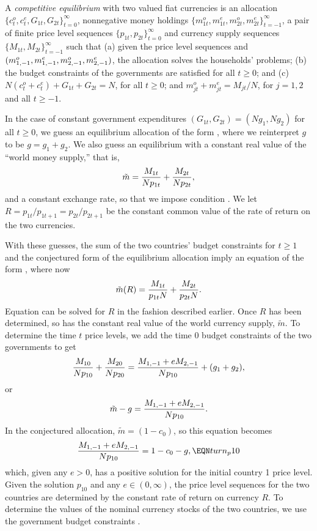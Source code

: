 \medskip
{} A {\it competitive equilibrium\/} with two valued
fiat currencies is an allocation $\{c_t^o, c_t^e, G_{1t},G_{2t}\}_{t=0}^\infty$,
nonnegative money holdings $\{m_{1t}^o, m_{1t}^e, m_{2t}^o, m_{2t}^e  \}_{t=-1}^\infty$,
a pair of finite
price level sequences $\{p_{1t},p_{2t}\}_{t=0}^\infty$ and
currency supply sequences $\{M_{1t}, M_{2t}\}_{t=-1}^\infty$
such that  %
(a)  given the price level sequences and
$(m^o_{1,-1},m^e_{1,-1}, \hfil\break m^o_{2,-1},m^e_{2,-1})$, the
allocation solves the households' problems;
(b) the budget constraints of the governments are satisfied for all $t \geq 0$; and
(c) $N(c^o_t+c^e_t)+G_{1t}+G_{2t}=N$, for all $t \geq 0$; and
$m^o_{jt}+m^e_{jt}=M_{jt}/N$, for $j=1,2$ and all $t \geq -1$.

\medskip

In the case of constant government expenditures $(G_{1t},G_{2t})=(N g_1, N g_2)$
for all $t\geq 0$,
we guess an equilibrium allocation of the  form
, where we reinterpret $g$ to be
$g=g_1+g_2$.
We also guess an equilibrium with a constant real value of the
``world money supply,'' that is,
$$ \tilde m = {M_{1t} \over N p_{1t}} + {M_{2t} \over N p_{2t}},$$
and a constant exchange rate, so that we impose condition .  We
let $R =p_{1t}/ p_{1t+1} = p_{2t}/ p_{2t+1}$
be the constant common value of the rate of return on the
two currencies.

   With these guesses, the sum of the two countries' budget
constraints  for $t \geq 1$ and the conjectured
form of the equilibrium allocation imply an
equation of the form ,
where now
$$ \tilde m(R) = {M_{1t} \over p_{1t} N} +{M_{2t} \over p_{2t} N }.$$
Equation  can be solved for $R$ in the  fashion described
earlier.  Once $R$ has been determined,
so has the constant real value of the world
currency supply, $\tilde m$.
 To determine the time $t$ price levels, we add the
time $0$ budget constraints of the two governments to get
$${M_{10} \over N p_{10}} + {M_{20} \over N p_{20}}
     = {M_{1,-1} + e M_{2,-1} \over N p_{10}} + (g_1+g_2) ,$$
or
$$ \tilde m - g = {M_{1,-1}+eM_{2,-1} \over N p_{10} }.$$
In the conjectured allocation, $\tilde m = (1-c_0)$,
so this equation becomes
$$ {M_{1,-1} + e M_{2,-1} \over N p_{10}} = 1 - c_0 - g ,    \EQN turn_p10$$
which, given any $e > 0$,
has a positive solution for the initial country 1 price
level. Given the solution $p_{10}$ and any $e \in (0,\infty)$,
the price level sequences  for the two countries are determined
by the constant rate of return on currency $R$.
To determine the values of the nominal currency stocks
of the two countries, we use the government budget constraints
.

